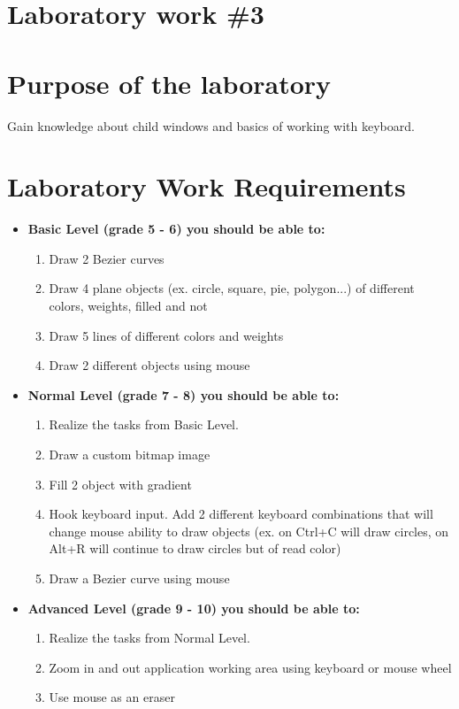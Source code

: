 \section*{Laboratory work \#3}

\section{Purpose of the laboratory}
Gain knowledge about child windows and basics of working with keyboard.
\section{Laboratory Work Requirements}
\begin{itemize}
\item \textbf{Basic Level (grade 5 - 6) you should be able to:}
	\begin{enumerate}
	\item Draw 2 Bezier curves
      \item Draw 4 plane objects (ex. circle, square, pie, polygon...) of different colors, weights, filled and not
      \item Draw 5 lines of different colors and weights
      \item Draw 2 different objects using mouse
      \end{enumerate}
\item \textbf{Normal Level (grade 7 - 8) you should be able to:}
      \begin{enumerate}
     \item Realize the tasks from Basic Level.
    \item Draw a custom bitmap image
    \item Fill 2 object with gradient
    \item Hook keyboard input. Add 2 different keyboard combinations that will change mouse ability to draw objects (ex. on Ctrl+C will draw circles, on Alt+R will continue to draw circles but of read color)
    \item Draw a Bezier curve using mouse
          \end{enumerate}
\item \textbf{Advanced Level (grade 9 - 10) you should be able to:}
      \begin{enumerate}
    \item Realize the tasks from Normal Level.
    \item Zoom in and out application working area using keyboard or mouse wheel
    \item Use mouse as an eraser 
          \end{enumerate}
  \end{itemize}  

\clearpage